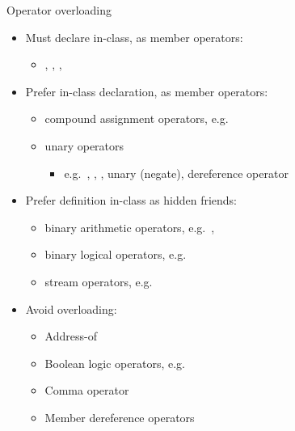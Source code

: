 \begin{frame}[fragile]
  \begin{goodpractice}{Operator overloading}
    \begin{itemize}
      \item Must declare in-class, as member operators:
      \begin{itemize}
        \item {}, , , 
      \end{itemize}
      \item Prefer in-class declaration, as member operators:
      \begin{itemize}
        \item compound assignment operators, e.g.\ 
        \item unary operators
        \begin{itemize}
          \item e.g.\ , , , unary  (negate), dereference operator 
        \end{itemize}
      \end{itemize}
      \item Prefer definition in-class as hidden friends:
      \begin{itemize}
        \item binary arithmetic operators, e.g.\ , 
        \item binary logical operators, e.g.\ 
        \item stream operators, e.g.\ 
      \end{itemize}
      \item Avoid overloading:
      \begin{itemize}
        \item Address-of 
        \item Boolean logic operators, e.g.\ 
        \item Comma operator 
        \item Member dereference operators 
      \end{itemize}
    \end{itemize}
  \end{goodpractice}
\end{frame}
